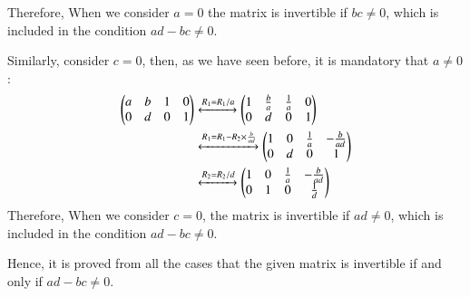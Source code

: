 \documentclass[journal,12pt,twocolumn]{IEEEtran}
\begin{document}
Therefore, When we consider $a=0$ the matrix is invertible if $bc\neq0$, which is included in the condition $ad-bc\neq0$. \par
Similarly, consider $c=0$, then, as we have seen before, it is mandatory that $a\neq0$:
\begin{align}
     \begin{pmatrix}a & b & 1 & 0 \\ 0 & d & 0 & 1\end{pmatrix} &\xleftrightarrow{R_1 = R_1/a}\begin{pmatrix}1 & \frac{b}{a} & \frac{1}{a} & 0 \\ 0 & d & 0 & 1\end{pmatrix}\\
     &\xleftrightarrow{R_1 = R_1 - R_2\times\frac{b}{ad}}\begin{pmatrix}1 & 0 & \frac{1}{a} & -\frac{b}{ad} \\ 0 & d & 0 & 1\end{pmatrix}\\
     &\xleftrightarrow{R_2 = R_2/d}\begin{pmatrix}1 & 0 & \frac{1}{a} & -\frac{b}{ad} \\ 0 & 1 & 0 & \frac{1}{d}\end{pmatrix}
\end{align}
Therefore, When we consider $c=0$, the matrix is invertible if $ad\neq0$, which is included in the condition $ad-bc\neq0$.\par
Hence, it is proved from all the cases that the given matrix is invertible if and only if $ad - bc \neq 0$. 
\end{document}
